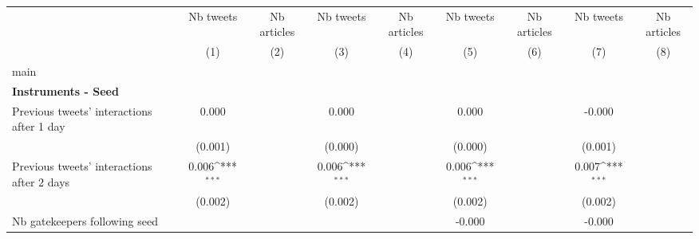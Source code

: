 {
\def\sym#1{\ifmmode^{#1}\else\(^{#1}\)\fi}
\begin{tabular}{l*{8}{c}}
\hline\hline
                    &\multicolumn{1}{c}{Nb tweets}&\multicolumn{1}{c}{Nb articles}&\multicolumn{1}{c}{Nb tweets}&\multicolumn{1}{c}{Nb articles}&\multicolumn{1}{c}{Nb tweets}&\multicolumn{1}{c}{Nb articles}&\multicolumn{1}{c}{Nb tweets}&\multicolumn{1}{c}{Nb articles}\\\cmidrule(lr){2-2}\cmidrule(lr){3-3}\cmidrule(lr){4-4}\cmidrule(lr){5-5}\cmidrule(lr){6-6}\cmidrule(lr){7-7}\cmidrule(lr){8-8}\cmidrule(lr){9-9}
                    &\multicolumn{1}{c}{(1)}         &\multicolumn{1}{c}{(2)}         &\multicolumn{1}{c}{(3)}         &\multicolumn{1}{c}{(4)}         &\multicolumn{1}{c}{(5)}         &\multicolumn{1}{c}{(6)}         &\multicolumn{1}{c}{(7)}         &\multicolumn{1}{c}{(8)}         \\
\hline
main                &                     &                     &                     &                     &                     &                     &                     &                     \\
\textbf{Instruments - Seed}&                     &                     &                     &                     &                     &                     &                     &                     \\
Previous tweets' interactions after 1 day&       0.000         &                     &       0.000         &                     &       0.000         &                     &      -0.000         &                     \\
                    &     (0.001)         &                     &     (0.000)         &                     &     (0.000)         &                     &     (0.001)         &                     \\
Previous tweets' interactions after 2 days&       0.006\sym{***}&                     &       0.006\sym{***}&                     &       0.006\sym{***}&                     &       0.007\sym{***}&                     \\
                    &     (0.002)         &                     &     (0.002)         &                     &     (0.002)         &                     &     (0.002)         &                     \\
Nb gatekeepers following seed&                     &                     &                     &                     &      -0.000         &                     &      -0.000         &                     \\

\end{tabular}}
